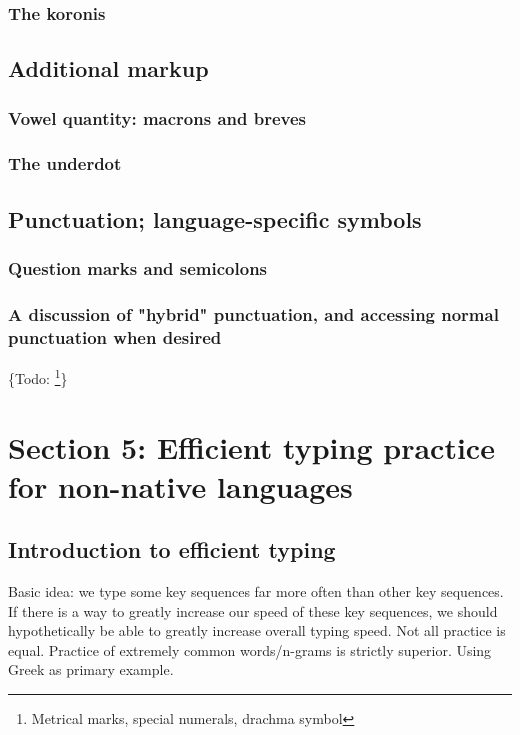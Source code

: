 \documentclass[11pt]{article}
\begin{document}
\subsubsection{The koronis}
\label{sec:orga61b9e0}

\subsection{Additional markup}
\label{sec:orga737899}

\subsubsection{Vowel quantity: macrons and breves}
\label{sec:org0df95ff}

\subsubsection{The underdot}
\label{sec:orgcf7a987}

\subsection{Punctuation; language-specific symbols}
\label{sec:org47f2b0c}

\subsubsection{Question marks and semicolons}
\label{sec:orgc3e3f07}

\subsubsection{A discussion of "hybrid" punctuation, and accessing normal punctuation when desired}
\label{sec:orgf5013e0}

\{Todo: \footnote{Metrical marks, special numerals, drachma symbol}\}

\section{Section 5: Efficient typing practice for non-native languages}
\label{sec:org4d2290e}

\subsection{Introduction to efficient typing}
\label{sec:org8271544}

Basic idea: we type some key sequences far more often than other key sequences. If there is a way to greatly increase our speed of these key sequences, we should hypothetically be able to greatly increase overall typing speed. Not all practice is equal. Practice of extremely common words/n-grams is strictly superior. Using Greek as primary example.
\end{document}
